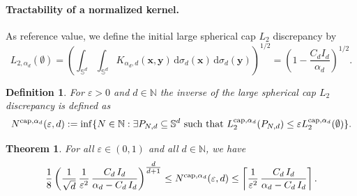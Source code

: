 \documentclass[12pt]{article}
\newcommand{\cp}{{\rm cap}}
\newtheorem{theorem}{Theorem}
\newtheorem{definition}{Definition}
\begin{document}
\paragraph{Tractability of a normalized kernel.} As reference value, we define the initial large spherical cap $L_2$ discrepancy by
\begin{equation*}
L_{2,\alpha_d}(\emptyset) = \left(\int_{\mathbb{S}^d} \int_{\mathbb{S}^d} K_{\alpha_d, d}(\bm{x}, \bm{y}) \,\mathrm{d} \sigma_d(\bm{x}) \,\mathrm{d} \sigma_d(\bm{y})\right)^{1/2} = \left(1 - \frac{C_d I_d}{\alpha_d}\right)^{1/2}.
\end{equation*}

\begin{definition}\rm
For $\varepsilon > 0$ and $d \in \mathbb{N}$ the inverse of the large spherical cap $L_2$ discrepancy is defined as 
\begin{equation*}
N^{\cp,\alpha_d}(\varepsilon, d) := \inf \{ N \in \mathbb{N}: \exists P_{N,d} \subseteq \mathbb{S}^d \ \text{such that}\ L_2^{\cp,\alpha_d}(P_{N,d}) \le \varepsilon L_2^{\cp,\alpha_d}(\emptyset) \}.
\end{equation*}
\end{definition}

\begin{theorem}\label{thm1}
For all $\varepsilon \in (0,1)$ and all $d \in \mathbb{N}$, we have
\begin{equation}\label{Ned_alpha}
\frac{1}{8} \left( \frac{1}{\sqrt{d}} \, \frac{1}{\varepsilon^2} \, \frac{C_d \, I_d}{\alpha_d - C_d \, I_d} \right)^{\tfrac{d}{d+1}} 
\leq 
N^{\cp,\alpha_d}(\varepsilon, d) 
\leq \left\lceil\frac{1}{\varepsilon^2} \, \frac{C_d \, I_d}{\alpha_d - C_d \, I_d}\right\rceil.
\end{equation}
\end{theorem}
\end{document}
